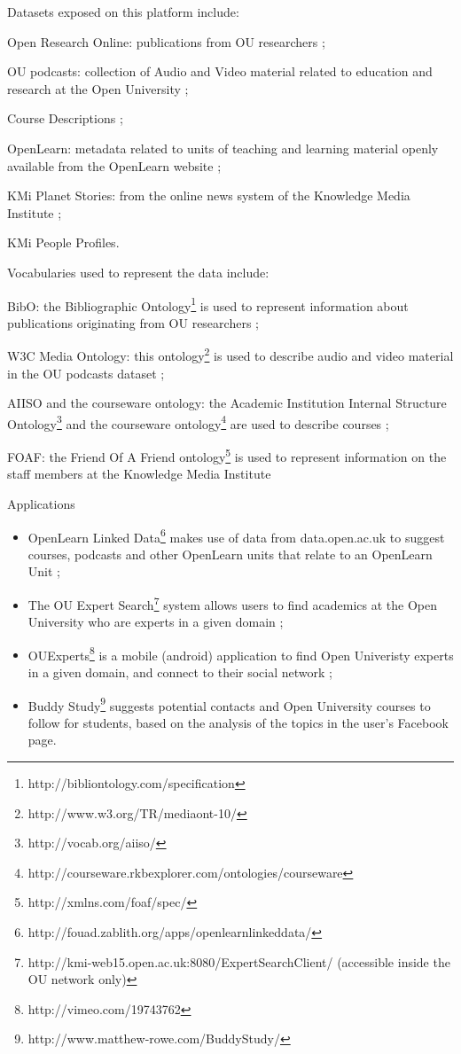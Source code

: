 \documentclass[a4paper,11pt]{report}
\begin{document}
Datasets exposed on this platform include:
\begin{description}
\item{Open Research Online:} publications from OU researchers ;
\item{OU podcasts:} collection of Audio and Video material related to education and research at the Open University ;
\item{Course Descriptions ;}
\item{OpenLearn:} metadata related to units of teaching and learning material openly available from the OpenLearn website ;
\item{KMi Planet Stories:} from the online news system of the Knowledge Media Institute ;
\item{KMi People Profiles.}
\end{description}

Vocabularies used to represent the data include:
\begin{description}
\item{BibO:} the Bibliographic Ontology\footnote{http://bibliontology.com/specification} is used to represent information about publications originating from OU researchers ;
\item{W3C Media Ontology:} this ontology\footnote{http://www.w3.org/TR/mediaont-10/} is used to describe audio and video material in the OU podcasts dataset ;
\item{AIISO and the courseware ontology:} the Academic Institution Internal Structure Ontology\footnote{http://vocab.org/aiiso/} and the courseware ontology\footnote{http://courseware.rkbexplorer.com/ontologies/courseware} are used to describe courses ;
\item{FOAF:} the Friend Of A Friend ontology\footnote{http://xmlns.com/foaf/spec/} is used to represent information on the staff members at the Knowledge Media Institute
\end{description}

Applications
\begin{itemize}
\item OpenLearn Linked Data\footnote{http://fouad.zablith.org/apps/openlearnlinkeddata/} makes use of data from data.open.ac.uk to suggest courses, podcasts and other OpenLearn units that relate to an OpenLearn Unit ;
\item The OU Expert Search\footnote{http://kmi-web15.open.ac.uk:8080/ExpertSearchClient/ (accessible inside the OU network only)} system allows users to find academics at the Open University who are experts in a given domain ;
\item OUExperts\footnote{http://vimeo.com/19743762} is a mobile (android) application to find Open Univeristy experts in a given domain, and connect to their social network ;
\item Buddy Study\footnote{http://www.matthew-rowe.com/BuddyStudy/} suggests potential contacts and Open University courses to follow for students, based on the analysis of the topics in the user's Facebook page.
\end{itemize}
\end{document}
